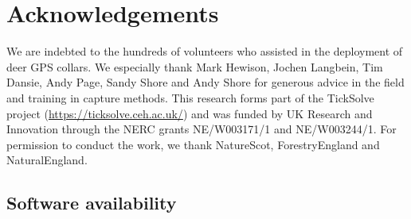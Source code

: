 \documentclass[10pt,a4paper]{article}
\begin{document}
\clearpage

\section{Acknowledgements}\label{acknowledgements}

We are indebted to the hundreds of volunteers who assisted in the deployment of deer GPS collars.
We especially thank Mark Hewison, Jochen Langbein, Tim Dansie, Andy Page, Sandy Shore and Andy Shore for generous advice in the field and training in capture methods.
This research forms part of the TickSolve project (\url{https://ticksolve.ceh.ac.uk/}) and was funded by UK Research and Innovation through the NERC grants NE/W003171/1 and NE/W003244/1.
For permission to conduct the work, we thank NatureScot, ForestryEngland and NaturalEngland.

\subsection{Software availability}\label{software-availability}
\end{document}
